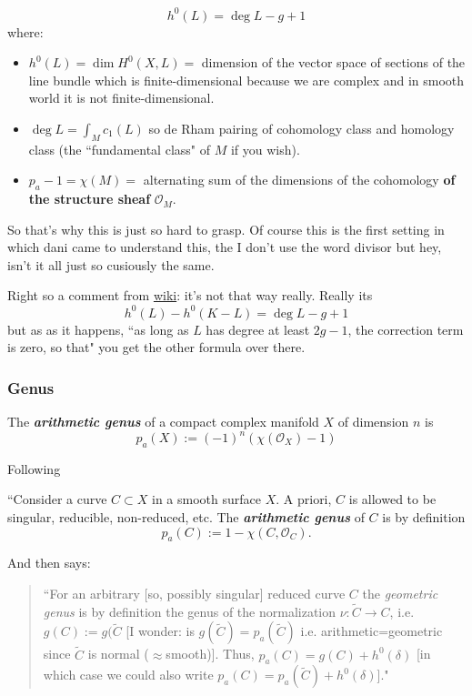 \[\boxed{h^{0}(L)=\operatorname{deg}L-g+1}\]
where:
\begin{itemize}
\item \(h^0(L)=\dim H^{0}(X,L)=\) dimension of the vector space of sections of the line bundle which is finite-dimensional because we are complex and in smooth world it is not finite-dimensional.
\item \(\operatorname{deg}L=\int_M c_1(L)\) so de Rham pairing of cohomology class and homology  class (the ``fundamental class" of \(M\) if you wish).
 \item \(p_a-1=\chi(M)=\) alternating sum of the dimensions of the cohomology \textbf{of the structure sheaf} \(\mathcal{O}_M\).
\end{itemize}
So that's why this is just so hard to grasp. Of course this is the first setting in which dani came to understand this, the I don't use the word divisor but hey, isn't it all just so cusiously the same.

Right so a comment from \href{https://en.wikipedia.org/wiki/Riemann%E2%80%93Roch_theorem}{wiki}: it's not that way really. Really its
	\[\boxed{h^0(L)-h^0(K-L)=\operatorname{deg}L-g+1}\]
	but as as it happens, ``as long as \(L\) has degree at least \(2g-1\), the correction term is zero, so that" you get the other formula over there.
\subsubsection{Genus}

\begin{defn}\leavevmode
The \textit{\textbf{arithmetic genus}} of a compact complex manifold \(X\) of dimension \(n\) is
\[p_a(X):=(-1)^n (\chi(\mathcal{O}_X)-1)\]
\end{defn}

Following 
\begin{defn}\leavevmode
``Consider a curve \(C \subset X\) in a smooth surface \(X\). A priori, \(C\) is allowed to be singular, reducible, non-reduced, etc. The \textit{\textbf{arithmetic genus}} of \(C\) is by definition
\[p_a(C):= 1 - \chi(C, \mathcal{O}_C).\]
\end{defn}

And then \cite{huk} says:
\begin{quotation}
	``For an arbitrary [so, possibly singular] reduced curve \(C\) the \textit{geometric genus} is by definition the genus of the normalization \(\nu:\tilde{C} \to C\), i.e. \(g(C):=g(\tilde{C}\) [I wonder: is \(g(\tilde{C})=p_a(\tilde{C})\) i.e. arithmetic=geometric since  \(\tilde{C}\) is normal (\(\approx\)smooth)]. Thus, \(p_a(C)=g(C)+h^{0}(\delta)\) [in which case we could also write  \(p_a(C)=p_a(\tilde{C})+h^{0}(\delta)\)]."
\end{quotation}

